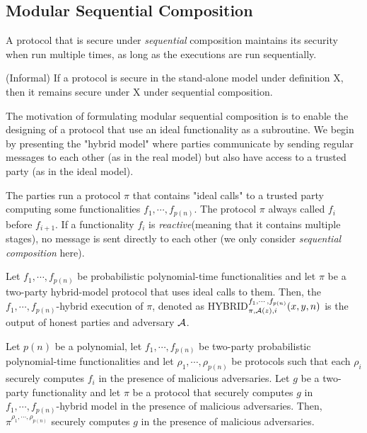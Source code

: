 \subsection{Modular Sequential Composition}
A protocol that is secure under {\it sequential} composition maintains its security when run multiple times, as long as the executions are run sequentially.
\begin{theorem}(Informal) If a protocol is secure in the stand-alone model under definition X, then it remains secure under X under sequential composition.
\end{theorem}
\begin{description}[leftmargin=0em]
\item[Modular sequential composition.] The motivation of formulating modular sequential composition is to enable the designing of a protocol that use an ideal functionality as a subroutine. We begin by presenting the "hybrid model" where parties communicate by sending regular messages to each other (as in the real model) but also have access to a trusted party (as in the ideal model).
\item[The hybrid model.] The parties run a protocol $\pi$ that contains "ideal calls" to a trusted party computing some functionalities $f_1,\cdots,f_{p(n)}$. The protocol $\pi$ always called $f_i$ before $f_{i+1}$. If a functionality $f_i$ is {\it reactive}(meaning that it contains multiple stages), no message is sent directly to each other (we only consider {\it sequential composition} here).
\item[Sequential composition-malicious adversaries] Let $f_1,\cdots,f_{p(n)}$ be probabilistic polynomial-time functionalities and let $\pi$ be a two-party hybrid-model protocol that uses ideal calls to them. Then, the $f_1,\cdots,f_{p(n)}$-{\sf hybrid execution of }$\pi$, denoted as {\sf HYBRID}$^{f_1,\cdots,f_{p(n)}}_{\pi,\mathcal{A}(z),i}(x,y,n)$ is the output of honest parties and adversary $\mathcal{A}$.
\end{description}
\begin{theorem} Let $p(n)$ be a polynomial, let $f_1,\cdots,f_{p(n)}$ be two-party probabilistic polynomial-time functionalities and let $\rho_1,\cdots,\rho_{p(n)}$ be protocols such that each $\rho_i$ securely computes $f_i$ in the presence of malicious adversaries. Let $g$ be a two-party functionality and let $\pi$ be a protocol that securely computes $g$ in $f_1,\cdots,f_{p(n)}$-{\sf hybrid model} in the presence of malicious adversaries. Then, $\pi^{\rho_1,\cdots,\rho_{p(n)}}$ securely computes $g$ in the presence of malicious adversaries.
\end{theorem}
\nocite{*} 